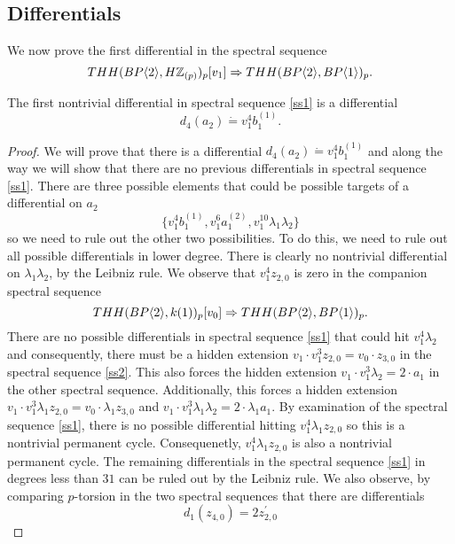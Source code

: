 \subsection{Differentials}
We now prove the first differential in the spectral sequence 
\begin{equation}\label{ss1} THH(BP\langle 2 \rangle,H\mathbb{Z}_{(p)})_p[v_1]\Rightarrow THH(BP\langle 2 \rangle,BP\langle 1 \rangle)_p.\end{equation}
\begin{lem}\label{firstdiff}
The first nontrivial differential in spectral sequence \ref{ss1} is a differential 
\[ d_{4}(a_2)\dot{=}v_1^4b_1^{(1)}.\]
\end{lem}

\begin{proof}
We will prove that there is a differential $d_{4}(a_2)\dot{=}v_1^4b_1^{(1)}$ and along the way we will show that there are no previous differentials in spectral sequence \eqref{ss1}. 
There are three possible elements that could be possible targets of a differential on $a_2$
\[ \{v_1^4b_1^{(1)}, v_1^6a_1^{(2)}, v_1^{10}\lambda_1\lambda_2 \} \]
so we need to rule out the other two possibilities. To do this, we need to rule out all possible differentials in lower degree. There is clearly no nontrivial differential on $\lambda_1\lambda_2$, by the Leibniz rule. We observe that $v_1^4z_{2,0}$ is zero in the companion spectral sequence 
\begin{equation}\label{ss2} THH(BP\langle 2 \rangle,k(1))_p[v_0]\Rightarrow THH(BP\langle 2 \rangle,BP\langle 1 \rangle)_p.\end{equation}
There are no possible differentials in spectral sequence \eqref{ss1} that could hit $v_1^4\lambda_2$ and consequently, there must be a hidden extension $v_1\cdot v_1^3z_{2,0}=v_0\cdot z_{3,0}$ in the spectral sequence \eqref{ss2}. This also forces the hidden extension $v_1\cdot v_1^3\lambda_2=2\cdot a_1$ in the other spectral sequence. Additionally, this forces a hidden extension $v_1\cdot v_1^3\lambda_1z_{2,0}=v_0\cdot\lambda_1z_{3,0}$ and $v_1\cdot v_1^3\lambda_1\lambda_2=2\cdot\lambda_1a_1$. By examination of the spectral sequence \eqref{ss1}, there is no possible differential hitting $v_1^4\lambda_1z_{2,0}$ so this is a nontrivial permanent cycle. Consequenetly, $v_1^4\lambda_1z_{2,0}$ is also a nontrivial permanent cycle. The remaining differentials in the spectral sequence \eqref{ss1} in degrees less than $31$ can be ruled out by the Leibniz rule. We also observe, by comparing $p$-torsion in the two spectral sequences that there are differentials 
\[ d_1(z_{4,0})=2z_{2,0}^{\prime}\]

\end{proof}
